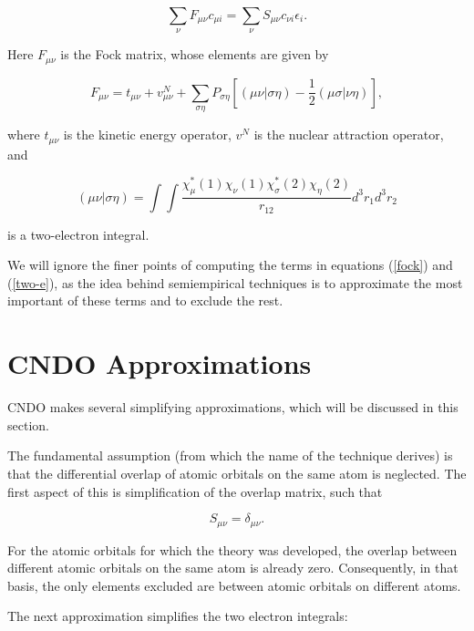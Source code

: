 \begin{equation}
	\sum_\nu F_{\mu\nu}c_{\mu i} = \sum_\nu S_{\mu\nu}c_{\nu i}
		\epsilon_i.
\end{equation}

\noindent Here $F_{\mu\nu}$ is the Fock matrix, whose elements are
given by 

\begin{equation}
	F_{\mu\nu} = t_{\mu\nu} + v^N_{\mu\nu} 
		+ \sum_{\sigma\eta}P_{\sigma\eta}\left[
			(\mu\nu|\sigma\eta)-\frac{1}{2}(\mu\sigma|\nu\eta)
			\right],
\label{fock}
\end{equation}

\noindent where $t_{\mu\nu}$ is the kinetic energy operator, $v^N$ is
the nuclear attraction operator, and

\begin{equation}
	(\mu\nu|\sigma\eta) = \int\int \frac
		{\chi_\mu^*(1)\chi_\nu(1)\chi_\sigma^*(2)\chi_\eta(2)}
		{r_{12}}d^3r_1d^3r_2
\label{two-e}
\end{equation}

\noindent is a two-electron integral.

We will ignore the finer points of computing the terms in equations
(\ref{fock}) and (\ref{two-e}), as the idea behind semiempirical
techniques is to approximate the most important of these terms and to
exclude the rest.

\section{CNDO Approximations}
CNDO makes several simplifying approximations, which will be discussed
in this section.

The fundamental assumption (from which the name of the technique
derives) is that the differential overlap of atomic orbitals on the
same atom is neglected. The first aspect of this is simplification of
the overlap matrix, such that

\begin{equation}
	S_{\mu\nu} = \delta_{\mu\nu}.
\label{ndo-overlap}
\end{equation}

\noindent For the atomic orbitals for which the theory was
developed, the overlap between different atomic orbitals on the same
atom is already zero. Consequently, in that basis, the only elements
excluded are between atomic orbitals on different atoms.

The next approximation simplifies the two electron integrals:

